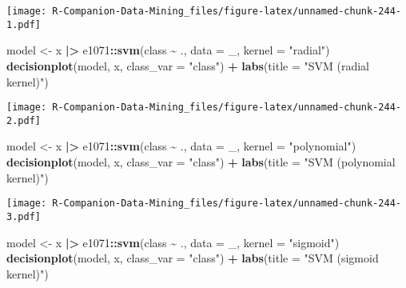 \documentclass[
  notitlepage]{book}
\newenvironment{Shaded}{\begin{snugshade}}{\end{snugshade}}
\newcommand{\DataTypeTok}[1]{\textcolor[rgb]{0.13,0.29,0.53}{#1}}
\newcommand{\ErrorTok}[1]{\textcolor[rgb]{0.64,0.00,0.00}{\textbf{#1}}}
\newcommand{\KeywordTok}[1]{\textcolor[rgb]{0.13,0.29,0.53}{\textbf{#1}}}
\newcommand{\NormalTok}[1]{#1}
\newcommand{\OperatorTok}[1]{\textcolor[rgb]{0.81,0.36,0.00}{\textbf{#1}}}
\newcommand{\StringTok}[1]{\textcolor[rgb]{0.31,0.60,0.02}{#1}}
\begin{document}
\texttt{[image: R-Companion-Data-Mining\_files/figure-latex/unnamed-chunk-244-1.pdf]}

\begin{Shaded}
\begin{Highlighting}[]
\NormalTok{model \textless{}{-}}\StringTok{ }\NormalTok{x }\OperatorTok{|}\ErrorTok{\textgreater{}}\StringTok{ }\NormalTok{e1071}\OperatorTok{::}\KeywordTok{svm}\NormalTok{(class }\OperatorTok{\textasciitilde{}}\StringTok{ }\NormalTok{., }\DataTypeTok{data =}\NormalTok{ \_, }
                         \DataTypeTok{kernel =} \StringTok{"radial"}\NormalTok{)}
\KeywordTok{decisionplot}\NormalTok{(model, x, }\DataTypeTok{class\_var =} \StringTok{"class"}\NormalTok{) }\OperatorTok{+}\StringTok{ }
\StringTok{  }\KeywordTok{labs}\NormalTok{(}\DataTypeTok{title =} \StringTok{"SVM (radial kernel)"}\NormalTok{)}
\end{Highlighting}
\end{Shaded}

\texttt{[image: R-Companion-Data-Mining\_files/figure-latex/unnamed-chunk-244-2.pdf]}

\begin{Shaded}
\begin{Highlighting}[]
\NormalTok{model \textless{}{-}}\StringTok{ }\NormalTok{x }\OperatorTok{|}\ErrorTok{\textgreater{}}\StringTok{ }\NormalTok{e1071}\OperatorTok{::}\KeywordTok{svm}\NormalTok{(class }\OperatorTok{\textasciitilde{}}\StringTok{ }\NormalTok{., }\DataTypeTok{data =}\NormalTok{ \_, }
                         \DataTypeTok{kernel =} \StringTok{"polynomial"}\NormalTok{)}
\KeywordTok{decisionplot}\NormalTok{(model, x, }\DataTypeTok{class\_var =} \StringTok{"class"}\NormalTok{) }\OperatorTok{+}\StringTok{ }
\StringTok{  }\KeywordTok{labs}\NormalTok{(}\DataTypeTok{title =} \StringTok{"SVM (polynomial kernel)"}\NormalTok{)}
\end{Highlighting}
\end{Shaded}

\texttt{[image: R-Companion-Data-Mining\_files/figure-latex/unnamed-chunk-244-3.pdf]}

\begin{Shaded}
\begin{Highlighting}[]
\NormalTok{model \textless{}{-}}\StringTok{ }\NormalTok{x }\OperatorTok{|}\ErrorTok{\textgreater{}}\StringTok{ }\NormalTok{e1071}\OperatorTok{::}\KeywordTok{svm}\NormalTok{(class }\OperatorTok{\textasciitilde{}}\StringTok{ }\NormalTok{., }\DataTypeTok{data =}\NormalTok{ \_, }
                         \DataTypeTok{kernel =} \StringTok{"sigmoid"}\NormalTok{)}
\KeywordTok{decisionplot}\NormalTok{(model, x, }\DataTypeTok{class\_var =} \StringTok{"class"}\NormalTok{) }\OperatorTok{+}\StringTok{ }
\StringTok{  }\KeywordTok{labs}\NormalTok{(}\DataTypeTok{title =} \StringTok{"SVM (sigmoid kernel)"}\NormalTok{)}
\end{Highlighting}
\end{Shaded}
\end{document}
